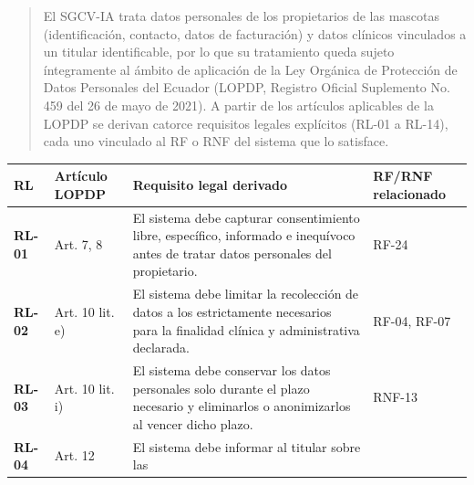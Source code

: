 \documentclass[
]{article}
\newcounter{none} %
\begin{document}
\begin{quote}
El SGCV-IA trata datos personales de los propietarios de las mascotas
(identificación, contacto, datos de facturación) y datos clínicos
vinculados a un titular identificable, por lo que su tratamiento queda
sujeto íntegramente al ámbito de aplicación de la Ley Orgánica de
Protección de Datos Personales del Ecuador (LOPDP, Registro Oficial
Suplemento No. 459 del 26 de mayo de 2021). A partir de los artículos
aplicables de la LOPDP se derivan catorce requisitos legales explícitos
(RL-01 a RL-14), cada uno vinculado al RF o RNF del sistema que lo
satisface.
\end{quote}

{\def\LTcaptype{none} %
\begin{longtable}[]{|
  >{\raggedright\arraybackslash}p{}|
  >{\raggedright\arraybackslash}p{}|
  >{\raggedright\arraybackslash}p{}|
  >{\raggedright\arraybackslash}p{}|}
\hline
\begin{minipage}[b]{\linewidth}\raggedright
\textbf{RL}
\end{minipage} & \begin{minipage}[b]{\linewidth}\raggedright
\textbf{Artículo LOPDP}
\end{minipage} & \begin{minipage}[b]{\linewidth}\raggedright
\textbf{Requisito legal derivado}
\end{minipage} & \begin{minipage}[b]{\linewidth}\raggedright
\textbf{RF/RNF relacionado}
\end{minipage} \\
\hline
\endhead
\hline
\endlastfoot
\textbf{RL-01} & Art. 7, 8 & El sistema debe capturar consentimiento
libre, específico, informado e inequívoco antes de tratar datos
personales del propietario. & RF-24 \\
\hline
\textbf{RL-02} & Art. 10 lit. e) & El sistema debe limitar la
recolección de datos a los estrictamente necesarios para la finalidad
clínica y administrativa declarada. & RF-04, RF-07 \\
\hline
\textbf{RL-03} & Art. 10 lit. i) & El sistema debe conservar los datos
personales solo durante el plazo necesario y eliminarlos o anonimizarlos
al vencer dicho plazo. & RNF-13 \\
\hline
\textbf{RL-04} & Art. 12 & El sistema debe informar al titular sobre las

\end{longtable}}
\end{document}

